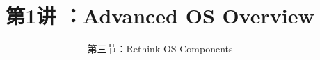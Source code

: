 


\title[第1讲]{第1讲 ：Advanced OS Overview} %
\subtitle{第三节：Rethink OS Components}
\date{}



\begin{frame}
\titlepage %
\end{frame}

